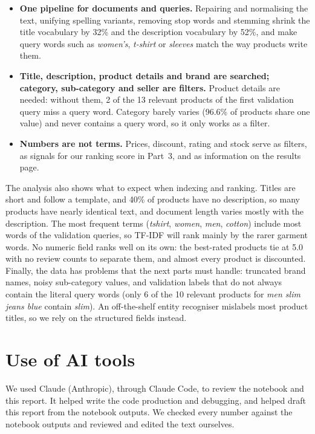 \documentclass[11pt,a4paper]{article}
\begin{document}
\begin{itemize}
  \item \textbf{One pipeline for documents and queries.} Repairing and normalising
    the text, unifying spelling variants, removing stop words and stemming shrink
    the title vocabulary by 32\% and the description vocabulary by 52\%, and make
    query words such as \emph{women's}, \emph{t-shirt} or \emph{sleeves} match the
    way products write them.
  \item \textbf{Title, description, product details and brand are searched;
    category, sub-category and seller are filters.} Product details are needed:
    without them, 2 of the 13 relevant products of the first validation query miss
    a query word. Category barely varies (96.6\% of products share one value) and
    never contains a query word, so it only works as a filter.
  \item \textbf{Numbers are not terms.} Prices, discount, rating and stock serve as
    filters, as signals for our ranking score in Part~3, and as information on the
    results page.
\end{itemize}

The analysis also shows what to expect when indexing and ranking. Titles are short
and follow a template, and 40\% of products have no description, so many products
have nearly identical text, and document length varies mostly with the
description. The most frequent terms (\emph{tshirt}, \emph{women}, \emph{men},
\emph{cotton}) include most words of the validation queries, so TF-IDF will rank
mainly by the rarer garment words. No numeric field ranks well on its own: the
best-rated products tie at 5.0 with no review counts to separate them, and almost
every product is discounted. Finally, the data has problems that the next parts
must handle: truncated brand names, noisy sub-category values, and validation
labels that do not always contain the literal query words (only 6 of the 10
relevant products for \emph{men slim jeans blue} contain \emph{slim}). An
off-the-shelf entity recogniser mislabels most product titles, so we rely on the
structured fields instead.

\section*{Use of AI tools}

We used Claude (Anthropic), through Claude Code, to review the notebook and this
report. It helped write the code production and debugging, and helped draft this report from the
notebook outputs. We checked every number against the notebook outputs and
reviewed and edited the text ourselves.



\end{document}
